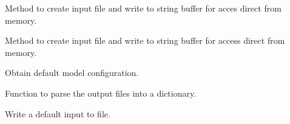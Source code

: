 \documentclass[letterpaper,10pt,english]{sphinxmanual}
\begin{document}
\begin{fulllineitems}
\begin{fulllineitems}
\end{fulllineitems}


\begin{fulllineitems}
\label{\detokenize{bcmdModel:bayescmd.bcmdModel.ModelBCMD.create_default_input}}
Method to create input file and write to string buffer for acces
direct from memory.

\end{fulllineitems}


\begin{fulllineitems}
\label{\detokenize{bcmdModel:bayescmd.bcmdModel.ModelBCMD.create_initialised_input}}
Method to create input file and write to string buffer for access
direct from memory.

\end{fulllineitems}


\begin{fulllineitems}
\label{\detokenize{bcmdModel:bayescmd.bcmdModel.ModelBCMD.get_defaults}}
Obtain default model configuration.

\end{fulllineitems}


\begin{fulllineitems}
\label{\detokenize{bcmdModel:bayescmd.bcmdModel.ModelBCMD.output_parse}}
Function to parse the output files into a dictionary.

\end{fulllineitems}


\begin{fulllineitems}
\label{\detokenize{bcmdModel:bayescmd.bcmdModel.ModelBCMD.write_default_input}}
Write a default input to file.


\end{fulllineitems}
\end{fulllineitems}
\end{document}
